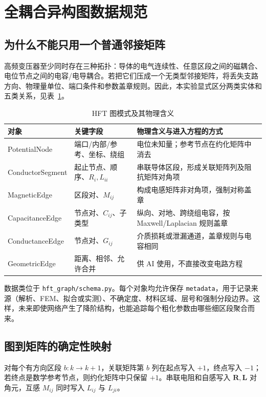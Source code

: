 \documentclass[11pt,a4paper]{ctexart}
\newcommand{\mat}[1]{\bm{#1}}
\newcommand{\code}[1]{\texttt{#1}}
\begin{document}
\section{全耦合异构图数据规范}

\subsection{为什么不能只用一个普通邻接矩阵}

高频变压器至少同时存在三种拓扑：导体的电气连续性、任意区段之间的磁耦合、电位节点之间的电容/电导耦合。若把它们压成一个无类型邻接矩阵，将丢失支路方向、物理量单位、端口条件和参数盖章规则。因此，本实验显式区分两类实体和五类关系，见表~\ref{tab:schema}。

\begin{table}[H]
\centering\small
\caption{HFT 图模式及其物理含义}\label{tab:schema}
\begin{tabularx}{\textwidth}{p{3.0cm}p{3.2cm}X}
\toprule
对象 & 关键字段 & 物理含义与进入方程的方式\\
\midrule
PotentialNode & 端口/内部/参考、坐标、绕组 & 电位未知量；参考节点在约化矩阵中消去\\
ConductorSegment & 起止节点、顺序、$R_i,L_{ii}$ & 串联导体区段，形成关联矩阵列及阻抗矩阵对角项\\
MagneticEdge & 区段对、$M_{ij}$ & 构成电感矩阵非对角项，强制对称盖章\\
CapacitanceEdge & 节点对、$C_{ij}$、子类型 & 纵向、对地、跨绕组电容，按 Maxwell/Laplacian 规则盖章\\
ConductanceEdge & 节点对、$G_{ij}$ & 介质损耗或泄漏通道，盖章规则与电容相同\\
GeometricEdge & 距离、相邻、允许合并 & 供 AI 使用，不直接改变电路方程\\
\bottomrule
\end{tabularx}
\end{table}

数据类位于 \code{hft\_graph/schema.py}。每个对象均允许保存 \code{metadata}，用于记录来源（解析、FEM、拟合或实测）、不确定度、材料区域、层号和强制分段边界。这样，未来即使网络产生了降阶结构，也能追踪每个粗化参数由哪些细区段聚合而来。

\subsection{图到矩阵的确定性映射}

对每个有方向区段 \(b:k\rightarrow k+1\)，关联矩阵第 \(b\) 列在起点写入 \(+1\)，终点写入 \(-1\)；若终点是数学参考节点，则约化矩阵中只保留 \(+1\)。串联电阻和自感写入 \(\mat R,\mat L\) 对角元，互感 \(M_{ij}\) 同时写入 \(L_{ij}\) 与 \(L_{ji}\)。
\end{document}
